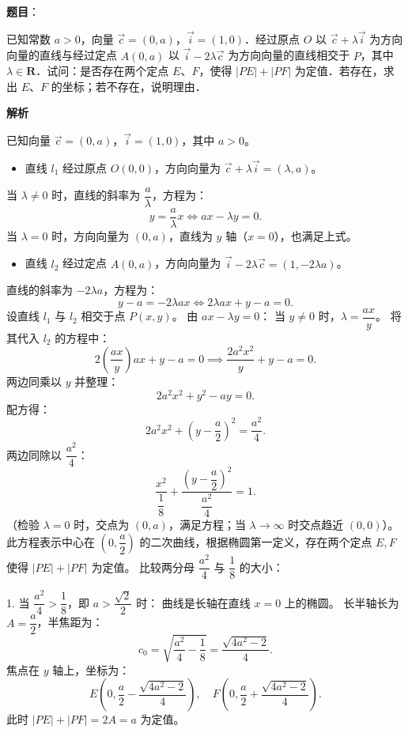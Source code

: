 \begin{answer}

\textbf{题目}：

已知常数 $a > 0$，向量 $\vec{c} = (0, a)$，$\vec{i} = (1, 0)$．经过原点 $O$ 以 $\vec{c} + \lambda\vec{i}$ 为方向向量的直线与经过定点 $A(0, a)$ 以 $\vec{i} - 2\lambda\vec{c}$ 为方向向量的直线相交于 $P$，其中 $\lambda \in \mathbf{R}$．试问：是否存在两个定点 $E$、$F$，使得 $|PE| + |PF|$ 为定值．若存在，求出 $E$、$F$ 的坐标；若不存在，说明理由．

\textbf{解析}

已知向量 $\vec{c} = (0, a)$，$\vec{i} = (1, 0)$，其中 $a > 0$。
\begin{itemize}
\item 直线 $l_1$ 经过原点 $O(0, 0)$，方向向量为 $\vec{c} + \lambda\vec{i} = (\lambda, a)$。
\end{itemize}
  当 $\lambda \ne 0$ 时，直线的斜率为 $\dfrac{a}{\lambda}$，方程为：
\nopagebreak[4]
\[y = \frac{a}{\lambda} x \iff ax - \lambda y = 0.\]
  当 $\lambda = 0$ 时，方向向量为 $(0, a)$，直线为 $y$ 轴（$x = 0$），也满足上式。
\begin{itemize}
\item 直线 $l_2$ 经过定点 $A(0, a)$，方向向量为 $\vec{i} - 2\lambda\vec{c} = (1, -2\lambda a)$。
\end{itemize}
  直线的斜率为 $-2\lambda a$，方程为：
\nopagebreak[4]
\[y - a = -2\lambda a x \iff 2\lambda a x + y - a = 0.\]
设直线 $l_1$ 与 $l_2$ 相交于点 $P(x, y)$。
由 $ax - \lambda y = 0$：
当 $y \ne 0$ 时，$\lambda = \dfrac{ax}{y}$。
将其代入 $l_2$ 的方程中：
\nopagebreak[4]
\[2\left(\frac{ax}{y}\right) a x + y - a = 0 \implies \frac{2a^2 x^2}{y} + y - a = 0.\]
两边同乘以 $y$ 并整理：
\nopagebreak[4]
\[2a^2 x^2 + y^2 - ay = 0.\]
配方得：
\nopagebreak[4]
\[2a^2 x^2 + \left(y - \frac{a}{2}\right)^2 = \frac{a^2}{4}.\]
两边同除以 $\dfrac{a^2}{4}$：
\nopagebreak[4]
\[\frac{x^2}{\dfrac{1}{8}} + \frac{\left(y - \dfrac{a}{2}\right)^2}{\dfrac{a^2}{4}} = 1.\]
（检验 $\lambda = 0$ 时，交点为 $(0, a)$，满足方程；当 $\lambda \to \infty$ 时交点趋近 $(0, 0)$）。
此方程表示中心在 $\left(0, \dfrac{a}{2}\right)$ 的二次曲线，根据椭圆第一定义，存在两个定点 $E, F$ 使得 $|PE| + |PF|$ 为定值。
比较两分母 $\dfrac{a^2}{4}$ 与 $\dfrac{1}{8}$ 的大小：

1. 当 $\dfrac{a^2}{4} > \dfrac{1}{8}$，即 $a > \dfrac{\sqrt{2}}{2}$ 时：
   曲线是长轴在直线 $x = 0$ 上的椭圆。
   长半轴长为 $A = \dfrac{a}{2}$，半焦距为：
\nopagebreak[4]
\[c_0 = \sqrt{\frac{a^2}{4} - \frac{1}{8}} = \frac{\sqrt{4a^2 - 2}}{4}.\]
   焦点在 $y$ 轴上，坐标为：
\nopagebreak[4]
\[E\left(0, \frac{a}{2} - \frac{\sqrt{4a^2 - 2}}{4}\right), \quad F\left(0, \frac{a}{2} + \frac{\sqrt{4a^2 - 2}}{4}\right).\]
   此时 $|PE| + |PF| = 2A = a$ 为定值。


\end{answer}
